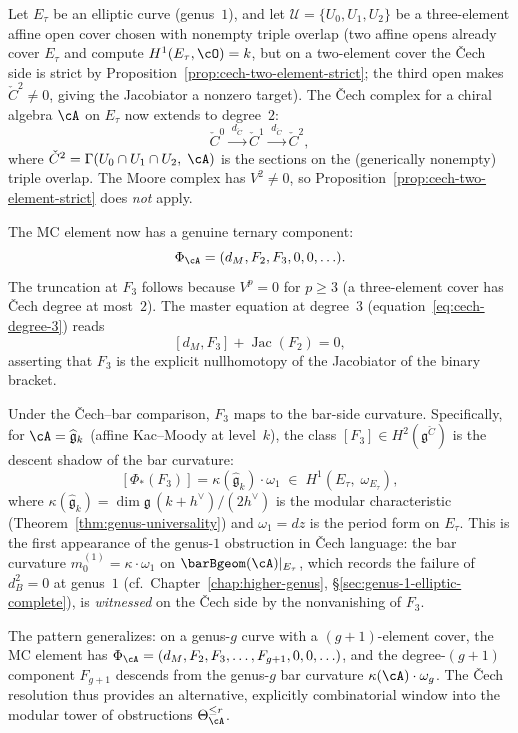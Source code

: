 \begin{example}
\label{ex:cech-hca-genus1}
Let $E_\tau$ be an elliptic curve (genus~$1$), and let
$\mathcal{U} = \{U_0, U_1, U_2\}$ be a three-element affine open
cover chosen with nonempty triple overlap \textup{(}two affine opens
already cover $E_\tau$ and compute $H^1(E_\tau,\cO)=k$, but on a
two-element cover the \v{C}ech side is strict by
Proposition~\ref{prop:cech-two-element-strict}; the third open makes
$\check{C}^2 \neq 0$, giving the Jacobiator a nonzero target\textup{)}.
The \v{C}ech complex for a chiral
algebra $\cA$ on $E_\tau$ now extends to degree~$2$:
\[
\check{C}^0 \xrightarrow{\;d_{\check{C}}\;} \check{C}^1
\xrightarrow{\;d_{\check{C}}\;} \check{C}^2,
\]
where $\check{C}^2 = \Gamma(U_0 \cap U_1 \cap U_2,\;\cA)$ is the
sections on the (generically nonempty) triple overlap. The Moore
complex has $V^2 \neq 0$, so
Proposition~\ref{prop:cech-two-element-strict} does \emph{not} apply.

The MC element now has a genuine ternary component:
\[
\Phi_\cA = (d_M, F_2, F_3, 0, 0, \ldots).
\]
The truncation at $F_3$ follows because $V^p = 0$ for $p \geq 3$
(a three-element cover has \v{C}ech degree at most~$2$). The
master equation at degree~$3$
(equation~\eqref{eq:cech-degree-3}) reads
\[
[d_M, F_3] + \operatorname{Jac}(F_2) = 0,
\]
asserting that $F_3$ is the explicit nullhomotopy of the Jacobiator
of the binary bracket.

Under the \v{C}ech--bar comparison, $F_3$ maps to the bar-side
curvature. Specifically, for
$\cA = \widehat{\mathfrak{g}}_k$ (affine Kac--Moody at level~$k$),
the class $[F_3] \in H^2(\mathfrak{g}^{\check{C}})$ is the descent
shadow of the bar curvature:
\[
[\Phi_*\!(F_3)] = \kappa(\widehat{\mathfrak{g}}_k)\cdot\omega_1
 \;\in\; H^1(E_\tau,\;\omega_{E_\tau}),
\]
where $\kappa(\widehat{\mathfrak{g}}_k) =
\dim\mathfrak{g}\,(k + h^\vee) / (2h^\vee)$ is the modular
characteristic
(Theorem~\ref{thm:genus-universality}) and
$\omega_1 = dz$ is the period form on $E_\tau$. This is the
first appearance of the genus-$1$ obstruction in \v{C}ech language:
the bar curvature $m_0^{(1)} = \kappa \cdot \omega_1$ on
$\barBgeom(\cA)|_{E_\tau}$, which records the failure of $d_B^2 = 0$
at genus~$1$
(cf.\ Chapter~\ref{chap:higher-genus},
\S\ref{sec:genus-1-elliptic-complete}), is \emph{witnessed} on the
\v{C}ech side by the nonvanishing of $F_3$.

The pattern generalizes: on a genus-$g$ curve with a $(g{+}1)$-element
cover, the MC element has
$\Phi_\cA = (d_M, F_2, F_3, \ldots, F_{g+1}, 0, 0, \ldots)$,
and the degree-$(g{+}1)$ component $F_{g+1}$ descends from the
genus-$g$ bar curvature $\kappa(\cA) \cdot \omega_g$. The
\v{C}ech resolution thus provides an alternative, explicitly
combinatorial window into the modular tower of obstructions
$\Theta_\cA^{\leq r}$.
\end{example}


